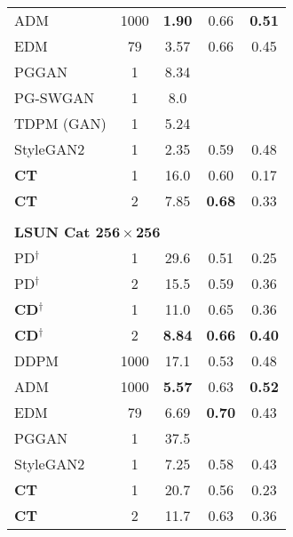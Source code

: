 \begin{table*}
\begin{minipage}[t]{0.49\linewidth}
{\begin{adjustbox}{max width=\linewidth}
\begin{tabular}{lcccc}
        ADM
        \cite{dhariwal2021diffusion}
        & 1000 & \textbf{1.90} & 0.66 &\textbf{0.51} \\
        EDM
        \cite{karras2022edm}
        & 79 & 3.57 & 0.66 & 0.45 \\
        PGGAN \cite{karras2018progressive} & 1 & 8.34 & &  \\
        PG-SWGAN \cite{wu2019sliced} & 1 & 8.0 & &  \\
        TDPM (GAN) \cite{zheng2023truncated} & 1 & 5.24 & & \\
        StyleGAN2 \cite{karras2020analyzing} & 1 & 2.35 & 0.59 & 0.48 \\
        \textbf{CT} & 1 & 16.0 & 0.60 & 0.17\\
        \textbf{CT} & 2 & 7.85 & \textbf{0.68} & 0.33\\
        \\[-2ex]
        \multicolumn{5}{l}{\textbf{LSUN Cat $\bm{256\times 256}$}}\\
        \Xhline{3\arrayrulewidth}
        PD$^\dagger$ \cite{salimans2022progressive} & 1 & 29.6 & 0.51 & 0.25 \\
        PD$^\dagger$ \cite{salimans2022progressive} & 2 & 15.5 & 0.59 & 0.36 \\
        \textbf{CD}$^\dagger$ & 1 & 11.0 & 0.65 & 0.36 \\
        \textbf{CD}$^\dagger$ & 2 & \textbf{8.84} & \textbf{0.66} & \textbf{0.40} \\
        \hline
        DDPM
        \cite{ho2020denoising}
        & 1000 & 17.1 & 0.53 & 0.48 \\
        ADM
        \cite{dhariwal2021diffusion}
        & 1000 & \textbf{5.57} & 0.63 & \textbf{0.52} \\
        EDM
        \cite{karras2022edm}
        & 79 & 6.69 & \textbf{0.70} & 0.43 \\
        PGGAN \cite{karras2018progressive} & 1 & 37.5 & & \\
        StyleGAN2 \cite{karras2020analyzing} & 1 & 7.25 & 0.58 & 0.43\\
        \textbf{CT} & 1 & 20.7 & 0.56 & 0.23 \\
        \textbf{CT} & 2 & 11.7 & 0.63 & 0.36
	\end{tabular}
    \end{adjustbox}
    }
\end{minipage}
\end{table*}

